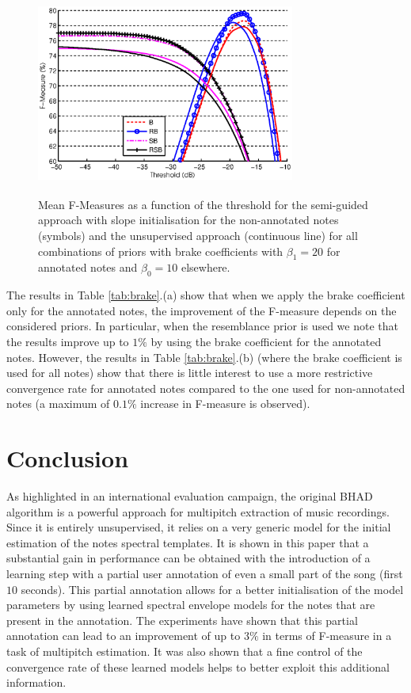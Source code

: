 \documentclass{article}
\begin{document}
\begin{figure}[!ht]
\begin{minipage}[b]{1.0\linewidth}
  \centering
  \centerline{\includegraphics[width=8.5cm,height=6.7cm]{figures/finalbrake.eps}}
\end{minipage}
\caption{Mean F-Measures as a function of the threshold for the semi-guided approach with slope initialisation for the non-annotated notes (symbols) and the unsupervised approach (continuous line) for all combinations of priors with brake coefficients with $\beta_1=20$ for annotated notes and $\beta_0=10$ elsewhere.}
\label{fig:fxt-brake}
\end{figure}


The results in Table \ref{tab:brake}.(a) show that when we apply the brake coefficient only for the annotated notes, the improvement of the F-measure depends on the considered priors. In particular, when the resemblance prior is used we note that the results improve up to $1\%$ by using the brake coefficient for the annotated notes. However, the results in Table \ref{tab:brake}.(b) (where the brake coefficient is used for all notes) show that there is little interest to use a more restrictive convergence rate for annotated notes compared to the one used for non-annotated notes (a maximum of $0.1\%$ increase in F-measure is observed).  


\section{Conclusion}
\label{sec:conc}

As highlighted in an international evaluation campaign, the original BHAD algorithm is a powerful approach for multipitch extraction of music recordings. Since it is entirely unsupervised, it relies on a very generic model for the initial estimation of the notes spectral templates. 
It is shown in this paper that a substantial gain in performance can be obtained with the introduction of a learning step with a partial user annotation of even a small part of the song (first $ 10$ seconds). This partial annotation allows for a better initialisation of the model parameters by using learned spectral envelope models for the notes that are present in the annotation. The experiments have shown that this partial annotation can lead to an improvement of up to $3\%$ in terms of F-measure in a task of multipitch estimation. It was also shown that a fine control of the convergence rate of these learned models helps to better exploit this additional information.  
\end{document}
